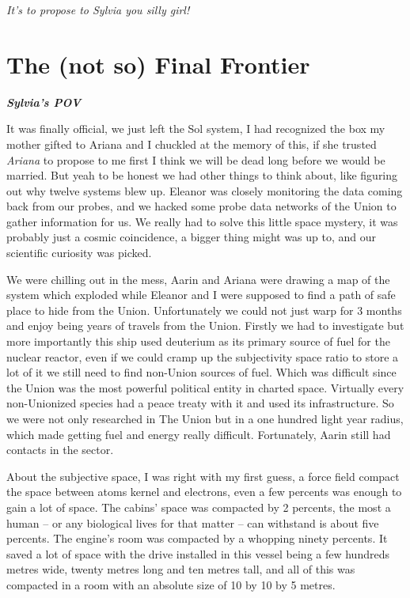 \documentclass[colorlinks,12pt,a4paper]{book}
\begin{document}
 \begin{center}
 \textit{
   It's to propose to Sylvia you silly girl!
 }
 \end{center}
 
 \chapter{The (not so) Final Frontier}
 \textit{\textbf{Sylvia's POV}}\par 
 \bigskip
 
 It was finally official, we just left the Sol system, I had recognized the box my mother gifted to Ariana and I chuckled at the memory
 of this, if she trusted \textit{Ariana} to propose to me first I think we will be dead long before we would be married. But yeah to 
 be honest we had other things to think about, like figuring out why twelve systems blew up. Eleanor was closely monitoring the data coming 
 back from our probes, and we hacked some probe data networks of the Union to gather information for us. We really had to solve this 
 little space mystery, it was probably just a cosmic coincidence, a bigger thing might was up to, and our scientific curiosity was picked.\par 
 \bigskip 
 
 We were chilling out in the mess, Aarin and Ariana were drawing a map of the system which exploded while Eleanor and I were supposed 
 to find a path of safe place to hide from the Union. Unfortunately we could not just warp for 3 months and enjoy being years of travels from 
 the Union. Firstly we had to investigate but more importantly this ship used deuterium as its primary source of fuel for the nuclear reactor, 
 even if we could cramp up the subjectivity space ratio to store a lot of it we still need to find non-Union sources of fuel. Which was difficult since 
 the Union was the most powerful political entity in charted space. Virtually every non-Unionized species had a peace treaty with it and 
 used its infrastructure. So we were not only researched in The Union but in a one hundred light year radius, which made getting fuel and 
 energy really difficult. Fortunately, Aarin still had contacts in the sector.\par 
 \bigskip 
 
 About the subjective space, I was right with my first guess, a force field compact the space between atoms kernel and electrons, even 
 a few percents was enough to gain a lot of space. The cabins' space was compacted by 2 percents, the most a human -- or any biological lives 
 for that matter -- can withstand is about five percents. The engine's room was compacted by a whopping ninety percents. It saved a lot 
 of space with the drive installed in this vessel being a few hundreds metres wide, twenty metres long and ten metres tall, and all of this 
 was compacted in a room with an absolute size of 10 by 10 by 5 metres. \par 
 \bigskip 
 
\end{document}
